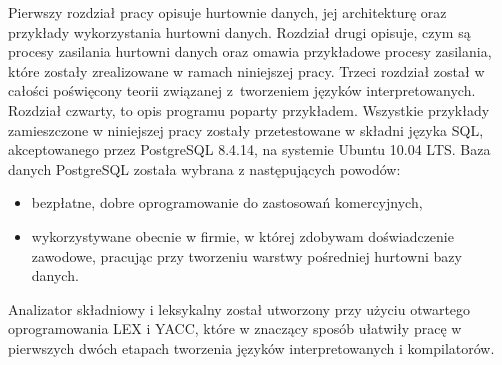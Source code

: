 Pierwszy rozdział pracy opisuje hurtownie danych, jej architekturę oraz przykłady wykorzystania hurtowni danych.
Rozdział drugi opisuje,
 czym są procesy zasilania hurtowni danych oraz omawia przykładowe procesy zasilania,
 które zostały zrealizowane w ramach niniejszej pracy.
Trzeci rozdział został w całości poświęcony teorii związanej z~tworzeniem języków interpretowanych.
Rozdział czwarty, to opis programu poparty przykładem.
Wszystkie przykłady zamieszczone w niniejszej pracy zostały przetestowane w składni języka SQL,
 akceptowanego przez PostgreSQL 8.4.14, na systemie Ubuntu 10.04 LTS. 
Baza danych PostgreSQL została wybrana z następujących powodów:
\begin{itemize}
 \item bezpłatne, dobre oprogramowanie do zastosowań komercyjnych,
 \item wykorzystywane obecnie w firmie,
    w której zdobywam doświadczenie zawodowe, pracując przy tworzeniu warstwy pośredniej hurtowni bazy danych.
\end{itemize}

Analizator składniowy i leksykalny został utworzony przy użyciu otwartego oprogramowania LEX i YACC, 
 które w znaczący sposób ułatwiły pracę w pierwszych dwóch etapach tworzenia języków interpretowanych i kompilatorów.
